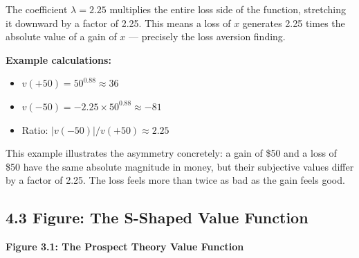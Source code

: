 \documentclass[12pt, letterpaper]{article}
\begin{document}
The coefficient $\lambda = 2.25$ multiplies the entire loss side of the function, stretching it downward by a factor of 2.25. This means a loss of $x$ generates 2.25 times the absolute value of a gain of $x$ --- precisely the loss aversion finding.

\textbf{Example calculations:}
\begin{itemize}
\item $v(+50) = 50^{0.88} \approx 36$
\item $v(-50) = -2.25 \times 50^{0.88} \approx -81$
\item Ratio: $|v(-50)| / v(+50) \approx 2.25$ \checkmark{}
\end{itemize}

This example illustrates the asymmetry concretely: a gain of \$50 and a loss of \$50 have the same absolute magnitude in money, but their subjective values differ by a factor of 2.25. The loss feels more than twice as bad as the gain feels good.


\subsection{4.3 Figure: The S-Shaped Value Function}


\textbf{Figure 3.1: The Prospect Theory Value Function}
\end{document}
